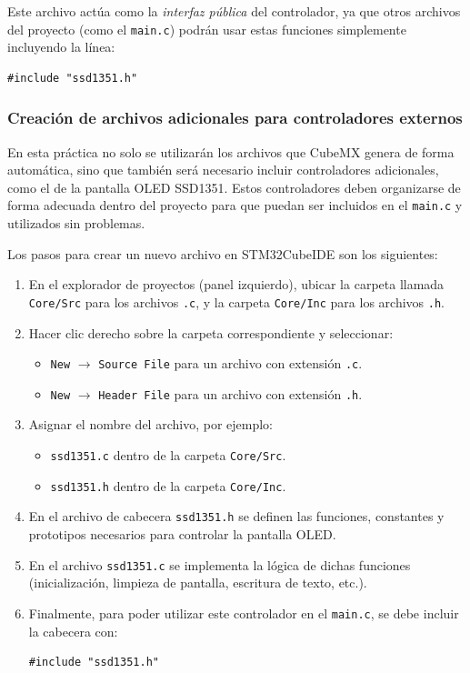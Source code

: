 \documentclass[a4paper,12pt]{article}
\begin{document}
Este archivo actúa como la \emph{interfaz pública} del controlador, ya que otros archivos del proyecto (como el \texttt{main.c}) podrán usar estas funciones simplemente incluyendo la línea:

\begin{verbatim}
#include "ssd1351.h"
\end{verbatim}


\subsubsection{Creación de archivos adicionales para controladores externos}

En esta práctica no solo se utilizarán los archivos que CubeMX genera de forma automática, sino que también será necesario incluir controladores adicionales, como el de la pantalla OLED SSD1351.  
Estos controladores deben organizarse de forma adecuada dentro del proyecto para que puedan ser incluidos en el \texttt{main.c} y utilizados sin problemas.

Los pasos para crear un nuevo archivo en STM32CubeIDE son los siguientes:

\begin{enumerate}
    \item En el explorador de proyectos (panel izquierdo), ubicar la carpeta llamada \texttt{Core/Src} para los archivos \texttt{.c}, y la carpeta \texttt{Core/Inc} para los archivos \texttt{.h}.
    \item Hacer clic derecho sobre la carpeta correspondiente y seleccionar:
    \begin{itemize}
        \item \texttt{New} $\rightarrow$ \texttt{Source File} para un archivo con extensión \texttt{.c}.
        \item \texttt{New} $\rightarrow$ \texttt{Header File} para un archivo con extensión \texttt{.h}.
    \end{itemize}
    \item Asignar el nombre del archivo, por ejemplo:
    \begin{itemize}
        \item \texttt{ssd1351.c} dentro de la carpeta \texttt{Core/Src}.
        \item \texttt{ssd1351.h} dentro de la carpeta \texttt{Core/Inc}.
    \end{itemize}
    \item En el archivo de cabecera \texttt{ssd1351.h} se definen las funciones, constantes y prototipos necesarios para controlar la pantalla OLED.
    \item En el archivo \texttt{ssd1351.c} se implementa la lógica de dichas funciones (inicialización, limpieza de pantalla, escritura de texto, etc.).
    \item Finalmente, para poder utilizar este controlador en el \texttt{main.c}, se debe incluir la cabecera con:
    \begin{verbatim}
#include "ssd1351.h"
    \end{verbatim}
\end{enumerate}
\end{document}
